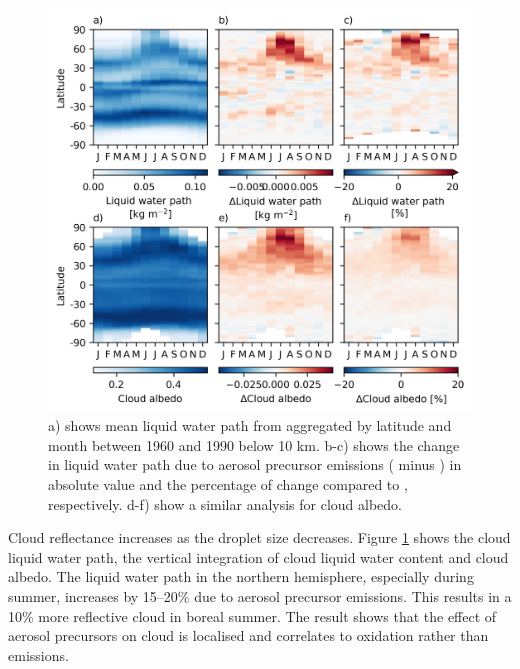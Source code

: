 \begin{figure}
    \centering
    \includegraphics{Chapter4/Figs/seasonal_cloud_props2_pothole.png}
    \caption[Cloud liquid water path and albedo aggregated by latitude and month between 1960 and 1989]{a) shows mean liquid water path from \histsst{} aggregated by latitude and month between 1960 and 1990 below 10 km. b-c) shows the change in liquid water path due to aerosol precursor emissions (\histsst{} minus \sstpiaer{}) in absolute value and the percentage of change compared to \sstpiaer{}, respectively. d-f) show a similar analysis for cloud albedo.}
    \label{fig:ch4:seasonal-cloud-props2}
\end{figure}

Cloud reflectance increases as the droplet size decreases. Figure \ref{fig:ch4:seasonal-cloud-props2} shows the cloud liquid water path, the vertical integration of cloud liquid water content and cloud albedo. The liquid water path in the northern hemisphere, especially during summer, increases by 15--20\% due to aerosol precursor emissions. This results in a 10\% more reflective cloud in boreal summer. The result shows that the effect of aerosol precursors on cloud is localised and correlates to  oxidation rather than emissions.

